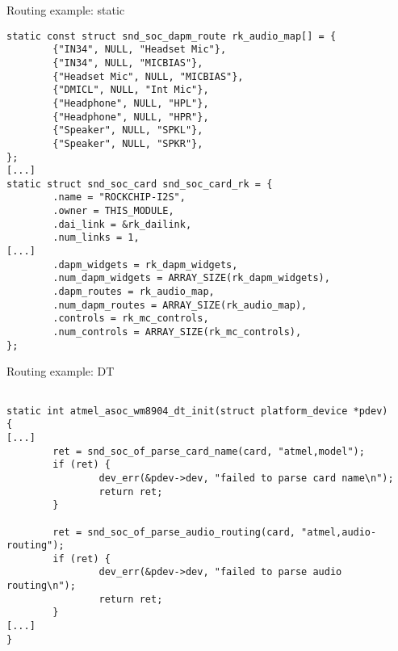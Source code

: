 \begin{frame}[fragile]{Routing example: static}
  \begin{block}{}
    \fontsize{8}{8}\selectfont
    \begin{verbatim}
static const struct snd_soc_dapm_route rk_audio_map[] = {
        {"IN34", NULL, "Headset Mic"},
        {"IN34", NULL, "MICBIAS"},
        {"Headset Mic", NULL, "MICBIAS"},
        {"DMICL", NULL, "Int Mic"},
        {"Headphone", NULL, "HPL"},
        {"Headphone", NULL, "HPR"},
        {"Speaker", NULL, "SPKL"},
        {"Speaker", NULL, "SPKR"},
};
[...]
static struct snd_soc_card snd_soc_card_rk = {
        .name = "ROCKCHIP-I2S",
        .owner = THIS_MODULE,
        .dai_link = &rk_dailink,
        .num_links = 1,
[...]
        .dapm_widgets = rk_dapm_widgets,
        .num_dapm_widgets = ARRAY_SIZE(rk_dapm_widgets),
        .dapm_routes = rk_audio_map,
        .num_dapm_routes = ARRAY_SIZE(rk_audio_map),
        .controls = rk_mc_controls,
        .num_controls = ARRAY_SIZE(rk_mc_controls),
};
    \end{verbatim}
  \end{block}
\end{frame}

\begin{frame}[fragile]{Routing example: DT}
  \begin{block}{}
    \fontsize{10}{10}\selectfont
    \begin{verbatim}

static int atmel_asoc_wm8904_dt_init(struct platform_device *pdev)
{
[...]
        ret = snd_soc_of_parse_card_name(card, "atmel,model");
        if (ret) {
                dev_err(&pdev->dev, "failed to parse card name\n");
                return ret;
        }

        ret = snd_soc_of_parse_audio_routing(card, "atmel,audio-routing");
        if (ret) {
                dev_err(&pdev->dev, "failed to parse audio routing\n");
                return ret;
        }
[...]
}
    \end{verbatim}
  \end{block}
\end{frame}

